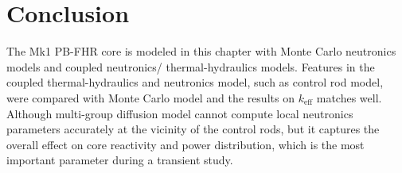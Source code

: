 \documentclass{elsarticle}
\newcommand{\keff}{{\ensuremath{k_{\mathrm{eff}}}} }
\begin{document}




\section{Conclusion}

The Mk1 PB-FHR core is modeled in this chapter with Monte Carlo neutronics models and coupled neutronics/ thermal-hydraulics models. 
Features in the coupled thermal-hydraulics and neutronics model, such as control rod model, were compared with Monte Carlo model and the results on \keff matches well. Although multi-group diffusion model cannot compute local neutronics parameters accurately at the vicinity of the control rods, but it captures the overall effect on core reactivity and power distribution, which is the most important parameter during a transient study.
\end{document}
